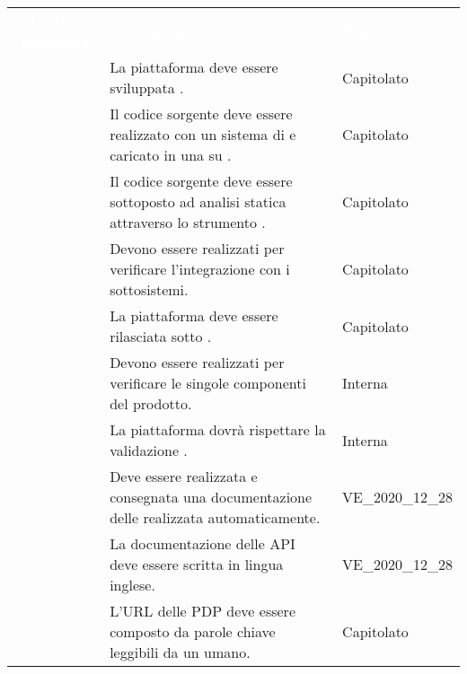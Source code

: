 \renewcommand{\arraystretch}{1.5}
\begin{longtable}{|c C{9.5cm} C{2.5cm}|} 
	
	\textcolor{white}{\textbf{Codice Requisito}}&
	\textcolor{white}{\textbf{Descrizione}}&
	\textcolor{white}{\textbf{Fonte}}\\	
	
	 & La piattaforma deve essere sviluppata . & Capitolato \\
	
	 & Il codice sorgente deve essere realizzato con un sistema di  e caricato in una  su \textit{}. & Capitolato \\

	 & Il codice sorgente deve essere sottoposto ad analisi statica attraverso lo strumento . & Capitolato \\

	 & Devono essere realizzati  per verificare l'integrazione con i sottosistemi. & Capitolato \\

	 & La piattaforma deve essere rilasciata sotto . & Capitolato  \\

	 & Devono essere realizzati  per verificare le singole componenti del prodotto. & Interna  \\

	 & La piattaforma dovrà rispettare la validazione . & Interna \\
	
	 & Deve essere realizzata e consegnata una documentazione delle  realizzata automaticamente. & VE\_2020\_12\_28 \\
	
	 & La documentazione delle API deve essere scritta in lingua inglese. & VE\_2020\_12\_28 \\
	
	 & L'URL delle PDP deve essere composto da parole chiave leggibili da un umano. & Capitolato \\
	
\end{longtable}
